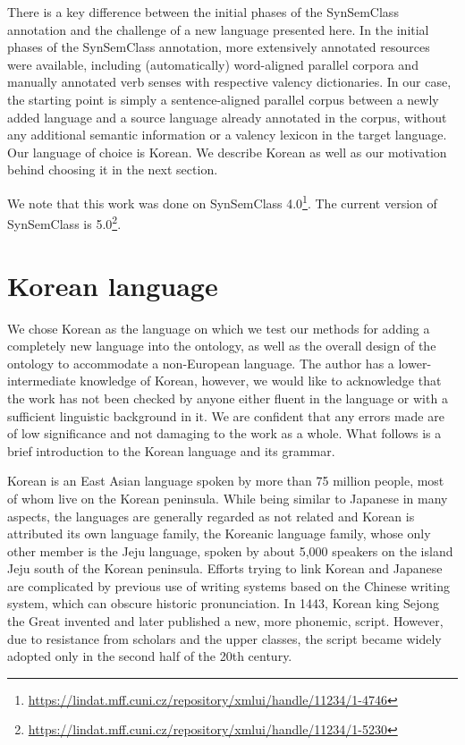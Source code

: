 There is a key difference between the initial phases of the SynSemClass annotation and the challenge of a new language presented here. In the initial phases of the SynSemClass annotation, more extensively annotated resources were available, including (automatically) word-aligned parallel corpora and manually annotated verb senses with respective valency dictionaries. In our case, the starting point is simply a sentence-aligned parallel corpus between a newly added language and a source language already annotated in the corpus, without any additional semantic information or a valency lexicon in the target language. Our language of choice is Korean. We describe Korean as well as our motivation behind choosing it in the next section.

We note that this work was done on SynSemClass 4.0\footnote{\url{https://lindat.mff.cuni.cz/repository/xmlui/handle/11234/1-4746}}. The current version of SynSemClass is 5.0\footnote{\url{https://lindat.mff.cuni.cz/repository/xmlui/handle/11234/1-5230}}.


\section{Korean language}

We chose Korean as the language on which we test our methods for adding a completely new language into the ontology, as well as the overall design of the ontology to accommodate a non-European language. The author has a lower-intermediate knowledge of Korean, however, we would like to acknowledge that the work has not been checked by anyone either fluent in the language or with a sufficient linguistic background in it. We are confident that any errors made are of low significance and not damaging to the work as a whole. What follows is a brief introduction to the Korean language and its grammar.

Korean is an East Asian language spoken by more than 75 million people, most of whom live on the Korean peninsula. While being similar to Japanese in many aspects, the languages are generally regarded as not related and Korean is attributed its own language family, the Koreanic language family, whose only other member is the Jeju language, spoken by about 5,000 speakers on the island Jeju south of the Korean peninsula. Efforts trying to link Korean and Japanese are complicated by previous use of writing systems based on the Chinese writing system, which can obscure historic pronunciation. In 1443, Korean king Sejong the Great invented and later published a new, more phonemic, script. However, due to resistance from scholars and the upper classes, the script became widely adopted only in the second half of the 20th century.

